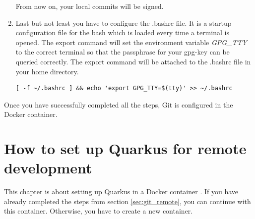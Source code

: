 \begin{enumerate}
        From now on, your local commits will be signed.   
        \item Last but not least you have to configure the .bashrc file. It is a startup configuration file for the \ac{bash} which is loaded every time a terminal is opened. The export command will set the environment variable \textit{GPG\_TTY} to the correct terminal so that the passphrase for your \ac{gpg}-key can be queried correctly. The export command will be attached  to the .bashrc file in your home directory.  
            \begin{lstlisting}[style=bash] 
[ -f ~/.bashrc ] && echo 'export GPG_TTY=$(tty)' >> ~/.bashrc
            \end{lstlisting}
    \end{enumerate}
    Once you have successfully completed all the steps, Git is configured in the Docker container.   


\section{How to set up Quarkus for remote development}\label{sec:quarkus_remote}
    This chapter is about setting up Quarkus in a Docker container \autocite[vgl.][]{quarkus}. If you have already completed the steps from section \ref{sec:git_remote}, you can continue with this container. Otherwise, you have to create a new container.

